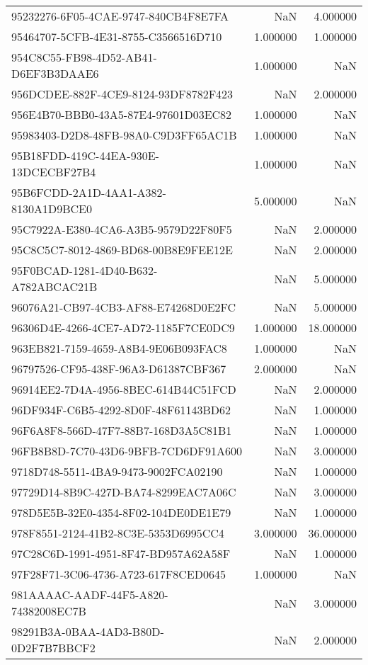 \begin{tabular}{lrr}
95232276-6F05-4CAE-9747-840CB4F8E7FA & NaN & 4.000000 \\
95464707-5CFB-4E31-8755-C3566516D710 & 1.000000 & 1.000000 \\
954C8C55-FB98-4D52-AB41-D6EF3B3DAAE6 & 1.000000 & NaN \\
956DCDEE-882F-4CE9-8124-93DF8782F423 & NaN & 2.000000 \\
956E4B70-BBB0-43A5-87E4-97601D03EC82 & 1.000000 & NaN \\
95983403-D2D8-48FB-98A0-C9D3FF65AC1B & 1.000000 & NaN \\
95B18FDD-419C-44EA-930E-13DCECBF27B4 & 1.000000 & NaN \\
95B6FCDD-2A1D-4AA1-A382-8130A1D9BCE0 & 5.000000 & NaN \\
95C7922A-E380-4CA6-A3B5-9579D22F80F5 & NaN & 2.000000 \\
95C8C5C7-8012-4869-BD68-00B8E9FEE12E & NaN & 2.000000 \\
95F0BCAD-1281-4D40-B632-A782ABCAC21B & NaN & 5.000000 \\
96076A21-CB97-4CB3-AF88-E74268D0E2FC & NaN & 5.000000 \\
96306D4E-4266-4CE7-AD72-1185F7CE0DC9 & 1.000000 & 18.000000 \\
963EB821-7159-4659-A8B4-9E06B093FAC8 & 1.000000 & NaN \\
96797526-CF95-438F-96A3-D61387CBF367 & 2.000000 & NaN \\
96914EE2-7D4A-4956-8BEC-614B44C51FCD & NaN & 2.000000 \\
96DF934F-C6B5-4292-8D0F-48F61143BD62 & NaN & 1.000000 \\
96F6A8F8-566D-47F7-88B7-168D3A5C81B1 & NaN & 1.000000 \\
96FB8B8D-7C70-43D6-9BFB-7CD6DF91A600 & NaN & 3.000000 \\
9718D748-5511-4BA9-9473-9002FCA02190 & NaN & 1.000000 \\
97729D14-8B9C-427D-BA74-8299EAC7A06C & NaN & 3.000000 \\
978D5E5B-32E0-4354-8F02-104DE0DE1E79 & NaN & 1.000000 \\
978F8551-2124-41B2-8C3E-5353D6995CC4 & 3.000000 & 36.000000 \\
97C28C6D-1991-4951-8F47-BD957A62A58F & NaN & 1.000000 \\
97F28F71-3C06-4736-A723-617F8CED0645 & 1.000000 & NaN \\
981AAAAC-AADF-44F5-A820-74382008EC7B & NaN & 3.000000 \\
98291B3A-0BAA-4AD3-B80D-0D2F7B7BBCF2 & NaN & 2.000000 \\

\end{tabular}
